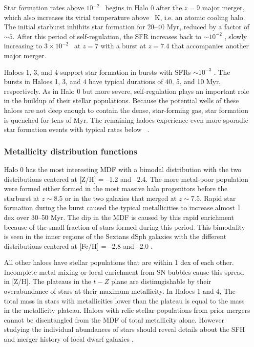 \documentclass[useAMS,usenatbib]{mn2e}
\begin{document}
Star formation rates above $10^{-2}$ \hsfr~begins in Halo 0 after the
$z=9$ major merger, which also increases its virial temperature above
~K, i.e. an atomic cooling halo.  The initial starburst
inhibits star formation for 20--40 Myr, reduced by a factor of $\sim
5$.  After this period of self-regulation, the SFR increases back to
$\sim 10^{-2}$ \hsfr, slowly increasing to $3 \times 10^{-2}$ \hsfr~at
$z=7$ with a burst at $z=7.4$ that accompanies another major merger.

Haloes 1, 3, and 4 support star formation in bursts with SFRs $\sim
10^{-3}$ \hsfr.  The bursts in Haloes 1, 3, and 4 have typical
durations of 40, 5, and 10 Myr, respectively.  As in Halo 0 but more
severe, self-regulation plays an important role in the buildup of
their stellar populations.  Because the potential wells of these
haloes are not deep enough to contain the dense, star-forming gas,
star formation is quenched for tens of Myr.  The remaining haloes
experience even more sporadic star formation events with typical rates
below ~\hsfr.

\subsubsection{Metallicity distribution functions}

Halo 0 has the most interesting MDF with a bimodal distribution with
the two distributions centered at [Z/H] = --1.2 and --2.4.  The more
metal-poor population were formed either formed in the most massive
halo progenitors before the starburst at $z \sim 8.5$ or in the two
galaxies that merged at $z \sim 7.5$.  Rapid star formation during the
burst caused the typical metallicities to increase almost 1 dex over
30--50 Myr.  The dip in the MDF is caused by this rapid enrichment
because of the small fraction of stars formed during this period.
This bimodality is seen in the inner regions of the Sextans dSph
galaxies with the different distributions centered at [Fe/H] = --2.8
and --2.0 \citep{Battaglia10}.

All other haloes have stellar populations that are within 1 dex of
each other.  Incomplete metal mixing or local enrichment from SN
bubbles cause this spread in [Z/H].  The plateaus in the $t-Z$ plane
are distinugishable by their overabundance of stars at their maximum
metallicity.  In Haloes 1 and 4, The total mass in stars with
metallicities lower than the plateau is equal to the mass in the
metallicity plateau.  Haloes with relic stellar populations from prior
mergers cannot be disentangled from the MDF of total metallicity
alone.  However studying the individual abundances of stars should
reveal details about the SFH and merger history of local dwarf
galaxies \citep{Frebel10}.
\end{document}
